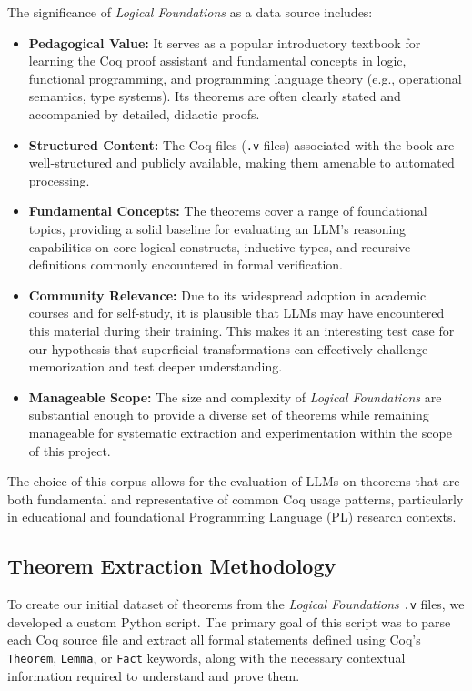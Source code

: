 The significance of \emph{Logical Foundations} as a data source includes:
\begin{itemize}
    \item \textbf{Pedagogical Value:} It serves as a popular introductory textbook for learning the Coq proof assistant and fundamental concepts in logic, functional programming, and programming language theory (e.g., operational semantics, type systems). Its theorems are often clearly stated and accompanied by detailed, didactic proofs.
    \item \textbf{Structured Content:} The Coq files (\texttt{.v} files) associated with the book are well-structured and publicly available, making them amenable to automated processing.
    \item \textbf{Fundamental Concepts:} The theorems cover a range of foundational topics, providing a solid baseline for evaluating an LLM's reasoning capabilities on core logical constructs, inductive types, and recursive definitions commonly encountered in formal verification.
    \item \textbf{Community Relevance:} Due to its widespread adoption in academic courses and for self-study, it is plausible that LLMs may have encountered this material during their training. This makes it an interesting test case for our hypothesis that superficial transformations can effectively challenge memorization and test deeper understanding.
    \item \textbf{Manageable Scope:} The size and complexity of \emph{Logical Foundations} are substantial enough to provide a diverse set of theorems while remaining manageable for systematic extraction and experimentation within the scope of this project.
\end{itemize}
The choice of this corpus allows for the evaluation of LLMs on theorems that are both fundamental and representative of common Coq usage patterns, particularly in educational and foundational Programming Language (PL) research contexts.

\subsection{Theorem Extraction Methodology}
\label{sec:theorem_extraction}

To create our initial dataset of theorems from the \emph{Logical Foundations} \texttt{.v} files, we developed a custom Python script. The primary goal of this script was to parse each Coq source file and extract all formal statements defined using Coq's \texttt{Theorem}, \texttt{Lemma}, or \texttt{Fact} keywords, along with the necessary contextual information required to understand and prove them.

